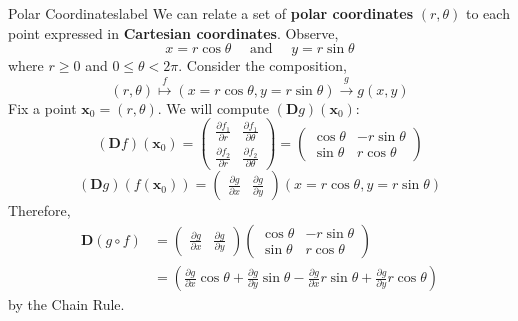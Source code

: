 \begin{ex}{Polar Coordinates}{label}
    We can relate a set of \textbf{polar coordinates} $(r, \theta)$ to each point  expressed in \textbf{Cartesian coordinates}. Observe,
    \[x=r \cos \theta \quad \text{ and } \quad y=r \sin \theta\]
    where $r \geq 0$ and $0 \leq \theta < 2\pi$.
    Consider the composition,
    \[(r, \theta) \stackrel{f}{\longmapsto}(x = r \cos \theta, y = r \sin \theta) \stackrel{g}{\longrightarrow} g(x, y)\]
    Fix a point $\mathbf{x}_0 = (r, \theta)$. We will compute $(\mathbf{D}g)(\mathbf{x}_0)$:
    \[(\mathbf{D}f)(\mathbf{x}_0)=\left(\begin{array}{cc}\frac{\partial f_1}{\partial r} & \frac{\partial f_1}{\partial \theta} \\ \frac{\partial f_2}{\partial r} & \frac{\partial f_2}{\partial \theta}\end{array}\right)=\left(\begin{array}{cc}\cos \theta & -r \sin \theta \\ \sin \theta & r \cos \theta\end{array}\right)\]
    \[
    (\mathbf{D} g)\left(f\left(\mathbf{x}_0\right)\right)=\left(\begin{array}{ll}\frac{\partial g}{\partial x} & \frac{\partial g}{\partial y}\end{array}\right)(x=r \cos \theta, y=r \sin \theta)
    \]
    Therefore, 
    \begin{align*}
    \mathbf{D}(g \circ f)&=
    \left(\begin{array}{ll}\frac{\partial g}{\partial x} & \frac{\partial g}{\partial y}\end{array}\right)\left(\begin{array}{cc}\cos \theta & -r \sin \theta \\ \sin \theta & r \cos \theta\end{array}\right) \\
    &=\left(\frac{\partial g}{\partial x} \cos \theta+\frac{\partial g}{\partial y} \sin \theta-\frac{\partial g}{\partial x} r \sin \theta+\frac{\partial g}{\partial y} r \cos \theta\right)
    \end{align*}
    by the Chain Rule.
\end{ex}

